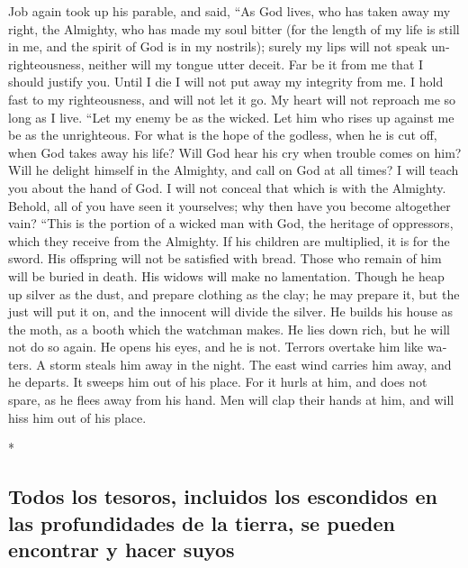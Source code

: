 \begin{paracol}{2}
\begin{otherlanguage}{english}
 Job again took up his parable, and said, 
``As God lives, who has taken away my right, the Almighty, who has made
my soul bitter  (for the length of my life is still in me,
and the spirit of God is in my nostrils);  surely my lips
will not speak unrighteousness, neither will my tongue utter deceit.
 Far be it from me that I should justify you. Until I die
I will not put away my integrity from me.  I hold fast to
my righteousness, and will not let it go. My heart will not reproach me
so long as I live.  ``Let my enemy be as the wicked. Let
him who rises up against me be as the unrighteous.  For
what is the hope of the godless, when he is cut off, when God takes away
his life?  Will God hear his cry when trouble comes on
him?  Will he delight himself in the Almighty, and call
on God at all times?  I will teach you about the hand of
God. I will not conceal that which is with the Almighty. 
Behold, all of you have seen it yourselves; why then have you become
altogether vain?  ``This is the portion of a wicked man
with God, the heritage of oppressors, which they receive from the
Almighty.  If his children are multiplied, it is for the
sword. His offspring will not be satisfied with bread. 
Those who remain of him will be buried in death. His widows will make no
lamentation.  Though he heap up silver as the dust, and
prepare clothing as the clay;  he may prepare it, but the
just will put it on, and the innocent will divide the silver.
 He builds his house as the moth, as a booth which the
watchman makes.  He lies down rich, but he will not do so
again. He opens his eyes, and he is not.  Terrors
overtake him like waters. A storm steals him away in the night.
 The east wind carries him away, and he departs. It
sweeps him out of his place.  For it hurls at him, and
does not spare, as he flees away from his hand.  Men will
clap their hands at him, and will hiss him out of his place.

\end{otherlanguage}

\switchcolumn[0]*

\hypertarget{todos-los-tesoros-incluidos-los-escondidos-en-las-profundidades-de-la-tierra-se-pueden-encontrar-y-hacer-suyos}{%
\subsection{Todos los tesoros, incluidos los escondidos en las
profundidades de la tierra, se pueden encontrar y hacer
suyos}\label{todos-los-tesoros-incluidos-los-escondidos-en-las-profundidades-de-la-tierra-se-pueden-encontrar-y-hacer-suyos}}


\end{paracol}
